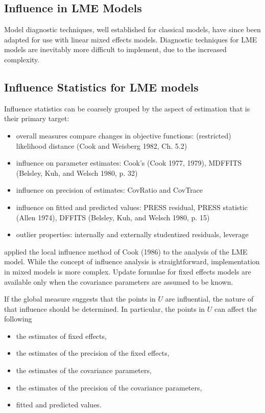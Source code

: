 \documentclass[00-MASTER.tex]{subfiles}
\begin{document}
\subsection{Influence in LME Models}
	
	Model diagnostic techniques, well established for classical models, have since been adapted for use with linear mixed effects models. Diagnostic techniques for LME models are inevitably more difficult to implement, due to the increased complexity.
	
	
	\subsection{Influence Statistics for LME models} %
	Influence statistics can be coarsely grouped by the aspect of estimation that is their primary target:
	\begin{itemize}
		\item overall measures compare changes in objective functions: (restricted) likelihood distance (Cook and Weisberg 1982, Ch. 5.2)
		\item influence on parameter estimates: Cook's  (Cook 1977, 1979), MDFFITS (Belsley, Kuh, and Welsch 1980, p. 32)
		\item influence on precision of estimates: CovRatio and CovTrace
		\item influence on fitted and predicted values: PRESS residual, PRESS statistic (Allen 1974), DFFITS (Belsley, Kuh, and Welsch 1980, p. 15)
		\item outlier properties: internally and externally studentized residuals, leverage
	\end{itemize}
	
	\citet{Beckman} applied the local influence method of Cook (1986) to the analysis of the LME model.
	While the concept of influence analysis is straightforward, implementation in mixed models is more complex. Update formulae for fixed effects models are available only when the covariance parameters are assumed to be known.
	
	If the global measure suggests that the points in $U$ are influential, the nature of that influence should be determined. In particular, the points in $U$ can affect the following
	
	\begin{itemize}
		\item the estimates of fixed effects,
		\item the estimates of the precision of the fixed effects,
		\item the estimates of the covariance parameters,
		\item the estimates of the precision of the covariance parameters,
		\item fitted and predicted values.
	\end{itemize}
	\newpage
\end{document}
